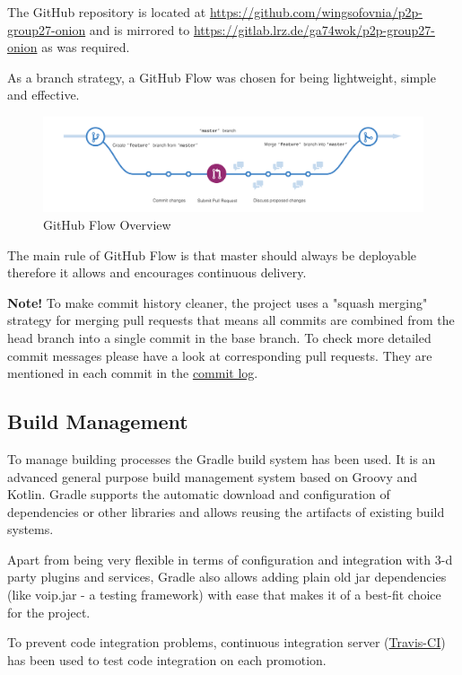 \documentclass{article}
\begin{document}
The GitHub repository is located at \href{https://github.com/wingsofovnia/p2p-group27-onion}{https://github.com/wingsofovnia/p2p-group27-onion} and is mirrored to \href{https://gitlab.lrz.de/ga74wok/p2p-group27-onion}{https://gitlab.lrz.de/ga74wok/p2p-group27-onion} as was required.

As a branch strategy, a GitHub Flow was chosen for being lightweight, simple and effective.

\begin{figure}[H]
\centering
     \includegraphics[width=1\textwidth]{github-flow-overview.png}
      \caption{GitHub Flow Overview \cite{githubflow}}
\end{figure}

The main rule of GitHub Flow is that master should always be deployable therefore it allows and encourages continuous delivery.

\textbf{Note!} To make commit history cleaner, the project uses a "squash merging" strategy for merging pull requests that means all commits are combined from the head branch into a single commit in the base branch. To check more detailed commit messages please have a look at corresponding pull requests. They are mentioned in each commit in the \href{https://github.com/wingsofovnia/p2p-group27-onion/commits/master}{commit log}.

\subsection{Build Management}
To manage building processes the Gradle build system has been used. It is an advanced general purpose build management system based on Groovy and Kotlin. Gradle supports the automatic download and configuration of dependencies or other libraries and allows reusing the artifacts of existing build systems.

Apart from being very flexible in terms of configuration and integration with 3-d party plugins and services, Gradle also allows adding plain old jar dependencies (like voip.jar - a testing framework) with ease that makes it of a best-fit choice for the project.

To prevent code integration problems, continuous integration server (\href{https://travis-ci.org/wingsofovnia/p2p-group27-onion}{Travis-CI}) has been used to test code integration on each promotion.
\end{document}
